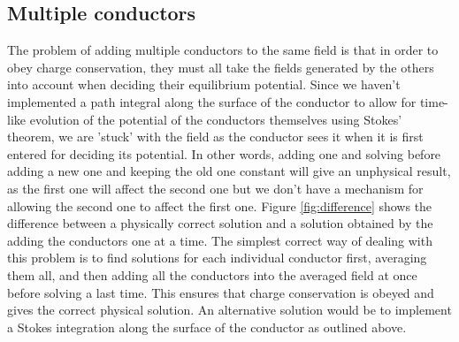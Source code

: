 \documentclass[aps,twocolumn,pre,nofootinbib,10pt]{revtex4-1}
\begin{document}
\subsection{Multiple conductors}
The problem of adding multiple conductors to the same field is that in order to obey charge conservation, they must all take the fields generated by the others into account when deciding their equilibrium potential. Since we haven't implemented a path integral along the surface of the conductor to allow for time-like evolution of the potential of the conductors themselves using Stokes' theorem, we are 'stuck' with the field as the conductor sees it when it is first entered for deciding its potential. In other words, adding one and solving before adding a new one and keeping the old one constant will give an unphysical result, as the first one will affect the second one but we don't have a mechanism for allowing the second one to affect the first one. Figure \ref{fig:difference} shows the difference between a physically correct solution and a solution obtained by the adding the conductors one at a time. The simplest correct way of dealing with this problem is to find solutions for each individual conductor 
first, averaging them all, and then adding all the conductors into the averaged field at once before solving a last time. This ensures that charge conservation is obeyed and gives the correct physical solution. An alternative solution would be to implement a Stokes integration along the surface of the conductor as outlined above.
\end{document}
